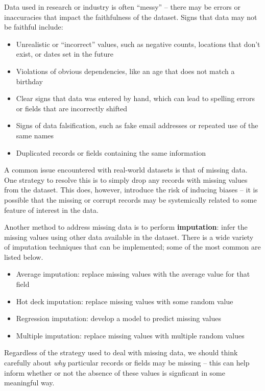 \documentclass[
  letterpaper,
  DIV=11,
  numbers=noendperiod]{scrreprt}
\providecommand{\tightlist}{%
  \setlength{\itemsep}{0pt}\setlength{\parskip}{0pt}}\usepackage{longtable,booktabs,array}
\begin{document}
Data used in research or industry is often ``messy'' -- there may be
errors or inaccuracies that impact the faithfulness of the dataset.
Signs that data may not be faithful include:

\begin{itemize}
\tightlist
\item
  Unrealistic or ``incorrect'' values, such as negative counts,
  locations that don't exist, or dates set in the future
\item
  Violations of obvious dependencies, like an age that does not match a
  birthday
\item
  Clear signs that data was entered by hand, which can lead to spelling
  errors or fields that are incorrectly shifted
\item
  Signs of data falsification, such as fake email addresses or repeated
  use of the same names
\item
  Duplicated records or fields containing the same information
\end{itemize}

A common issue encountered with real-world datasets is that of missing
data. One strategy to resolve this is to simply drop any records with
missing values from the dataset. This does, however, introduce the risk
of inducing biases -- it is possible that the missing or corrupt records
may be systemically related to some feature of interest in the data.

Another method to address missing data is to perform
\textbf{imputation}: infer the missing values using other data available
in the dataset. There is a wide variety of imputation techniques that
can be implemented; some of the most common are listed below.

\begin{itemize}
\tightlist
\item
  Average imputation: replace missing values with the average value for
  that field
\item
  Hot deck imputation: replace missing values with some random value
\item
  Regression imputation: develop a model to predict missing values
\item
  Multiple imputation: replace missing values with multiple random
  values
\end{itemize}

Regardless of the strategy used to deal with missing data, we should
think carefully about \emph{why} particular records or fields may be
missing -- this can help inform whether or not the absence of these
values is signficant in some meaningful way.
\end{document}
